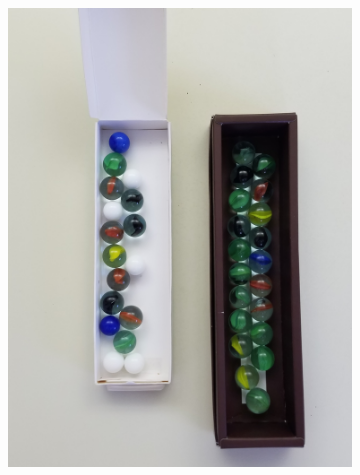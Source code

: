 \documentclass{article}
\begin{document}
\begin{figure}[H]
\begin{subfigure}{.5\textwidth}
		\includegraphics[width=.9\linewidth,angle=-90]{photos/m4}
	\end{subfigure}
\end{figure}
\end{document}
